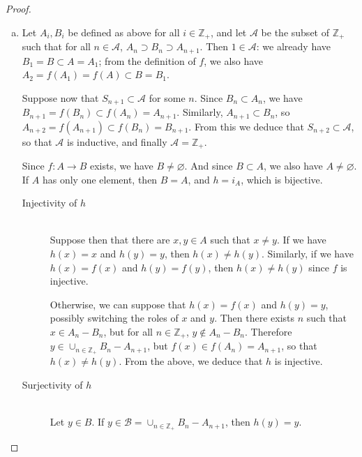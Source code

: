 \documentclass[11pt,a4paper,twoside]{article}
\theoremstyle{definition}
\begin{document}
\begin{proof}\hfill

  \begin{enumerate}[(a)]

  \item \label{it:a}
    Let $A_i, B_i$ be defined as above for all $i \in \mathbb{Z}_+$, and let $\mathscr{A}$ be the subset of $\mathbb{Z}_+$
    such that for all $n \in \mathscr{A}$, $A_n \supset B_n \supset A_{n + 1}$. Then $1 \in \mathscr{A}$: we already have
    $B_1 = B \subset A = A_1$; from the definition of $f$, we also have $A_2 = f (A_1) = f (A) \subset B = B_1$.

    Suppose now that $S_{n + 1} \subset \mathscr{A}$ for some $n$. Since $B_n \subset A_n$, we have $B_{n + 1} = f (B_n) \subset f (A_n) = A_{n + 1}$.
    Similarly, $A_{n + 1} \subset B_n$, so $A_{n + 2} = f (A_{n + 1}) \subset f (B_n) = B_{n + 1}$. From this we deduce that $S_{n + 2} \subset \mathscr{A}$,
    so that $\mathscr{A}$ is inductive, and finally $\mathscr{A} = \mathbb{Z}_+$.

    Since $f : A \to B$ exists, we have $B \neq \varnothing$. And since $B \subset A$, we also have $A \neq \varnothing$.
    If $A$ has only one element, then $B = A$, and $h = i_A$, which is bijective.

    \begin{description}

    \item[Injectivity of $h$] \hspace{0pt}\\
      Suppose then that there are $x, y \in A$ such that $x \neq y$. If we have $h (x) = x$ and $h (y) = y$, then $h (x) \neq h (y)$.
      Similarly, if we have $h (x) = f (x)$ and $h (y) = f (y)$, then $h (x) \neq h (y)$ since $f$ is injective.

      Otherwise, we can suppose that $h (x) = f (x)$ and $h (y) = y$, possibly switching the roles of $x$ and $y$.
      Then there exists $n$ such that $x \in A_n - B_n$, but for all $n \in \mathbb{Z}_+$, $y \notin A_n - B_n$.
      Therefore $y \in \cup_{n \in \mathbb{Z}_+} B_n - A_{n + 1}$, but $f (x) \in f (A_n) = A_{n + 1}$, so that $h (x) \neq h (y)$.
      From the above, we deduce that $h$ is injective.

    \item[Surjectivity of $h$] \hspace{0pt}\\
      Let $y \in B$. If $y \in \mathscr{B} = \cup_{n \in \mathbb{Z}_+} B_n - A_{n + 1}$, then $h (y) = y$.


\end{description}
\end{enumerate}
\end{proof}
\end{document}
